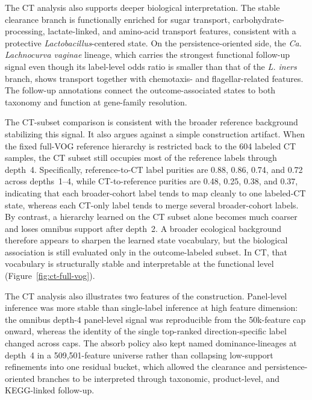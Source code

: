 \documentclass[11pt]{article}
\newcommand{\taxon}[1]{\emph{#1}}
\begin{document}
The CT analysis also supports deeper biological interpretation. The stable
clearance branch is functionally enriched for sugar transport, carbohydrate-processing,
lactate-linked, and amino-acid transport features, consistent with a protective
\taxon{Lactobacillus}-centered state. On the persistence-oriented side, the
\taxon{Ca. Lachnocurva vaginae} lineage, which carries the strongest
functional follow-up signal even though its label-level odds ratio is smaller
than that of the \taxon{L. iners} branch, shows transport together with
chemotaxis- and flagellar-related features. The follow-up annotations connect
the outcome-associated states to both taxonomy and function at gene-family
resolution.

The CT-subset comparison is consistent with the broader reference background
stabilizing this signal. It also argues against a simple construction artifact.
When the fixed full-VOG reference hierarchy is
restricted back to the 604 labeled CT samples, the CT subset still occupies
most of the reference labels through depth~4. Specifically, reference-to-CT
label purities are 0.88, 0.86, 0.74, and 0.72 across depths~1--4, while
CT-to-reference purities are 0.48, 0.25, 0.38, and 0.37, indicating that
each broader-cohort label tends to map cleanly to one labeled-CT state,
whereas each CT-only label tends to merge several broader-cohort labels.
By contrast, a hierarchy learned
on the CT subset alone becomes much coarser and loses omnibus support after
depth~2. A broader ecological background therefore appears to sharpen the
learned state vocabulary, but the biological association is still evaluated only
in the outcome-labeled subset. In CT, that vocabulary is structurally stable and
interpretable at the functional level
(Figure~\ref{fig:ct-full-vog}).

The CT analysis also illustrates two features of the construction. Panel-level
inference was more stable than single-label inference at high feature dimension:
the omnibus depth-4 panel-level signal was reproducible from the 50k-feature cap
onward, whereas the identity of the single top-ranked direction-specific label
changed across caps. The absorb policy also kept named dominance-lineages at
depth~4 in a 509,501-feature universe rather than collapsing low-support
refinements into one residual bucket, which allowed the clearance and
persistence-oriented branches to be interpreted through taxonomic,
product-level, and KEGG-linked follow-up.
\end{document}

